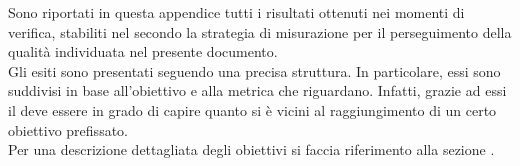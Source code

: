 
	Sono riportati in questa appendice tutti i risultati ottenuti nei momenti di verifica, stabiliti nel  secondo la strategia di misurazione per il perseguimento della qualità individuata nel presente documento.\\
	Gli esiti sono presentati seguendo una precisa struttura. In particolare, essi sono suddivisi in base all'obiettivo e alla metrica che riguardano. Infatti, grazie ad essi il  deve essere in grado di capire quanto si è vicini al raggiungimento di un certo obiettivo prefissato.\\
	Per una descrizione dettagliata degli obiettivi si faccia riferimento alla sezione .


